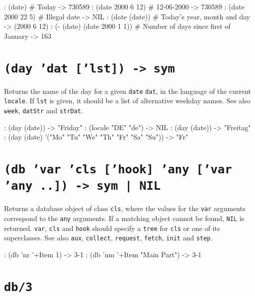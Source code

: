 \begin{wideverbatim}
: (date)                         # Today
-> 730589
: (date 2000 6 12)               # 12-06-2000
-> 730589
: (date 2000 22 5)               # Illegal date
-> NIL
: (date (date))                  # Today's year, month and day
-> (2000 6 12)
: (- (date) (date 2000 1 1))     # Number of days since first of January
-> 163
\end{wideverbatim}

 
\section*{\texttt{(day 'dat ['lst]) -> sym}}
\label{sec:func-ref-D-(day 'dat ['lst]) -> sym}


Returns the name of the day for a given \texttt{date} \texttt{dat}, in the language of
the current \texttt{locale}. If \texttt{lst} is given, it should be a list of
alternative weekday names. See also \texttt{week}, \texttt{datStr} and \texttt{strDat}.


\begin{wideverbatim}
: (day (date))
-> "Friday"
: (locale "DE" "de")
-> NIL
: (day (date))
-> "Freitag"
: (day (date) '("Mo" "Tu" "We" "Th" "Fr" "Sa" "Su"))
-> "Fr"
\end{wideverbatim}

 
\section*{\texttt{(db 'var 'cls ['hook] 'any ['var 'any ..]) -> sym | NIL}}
\label{sec:func-ref-D-(db 'var 'cls ['hook] 'any ['var 'any ..]) -> sym | NIL}


Returns a database object of class \texttt{cls}, where the values for the \texttt{var}
arguments correspond to the \texttt{any} arguments. If a matching object cannot
be found, \texttt{NIL} is returned. \texttt{var}, \texttt{cls} and \texttt{hook} should specify a
\texttt{tree} for \texttt{cls} or one of its superclasses. See also \texttt{aux}, \texttt{collect},
\texttt{request}, \texttt{fetch}, \texttt{init} and \texttt{step}.


\begin{wideverbatim}
: (db 'nr '+Item 1)
-> {3-1}
: (db 'nm '+Item "Main Part")
-> {3-1}
\end{wideverbatim}

 
\section*{\texttt{db/3}}
\label{sec:func-ref-D-db/3}


